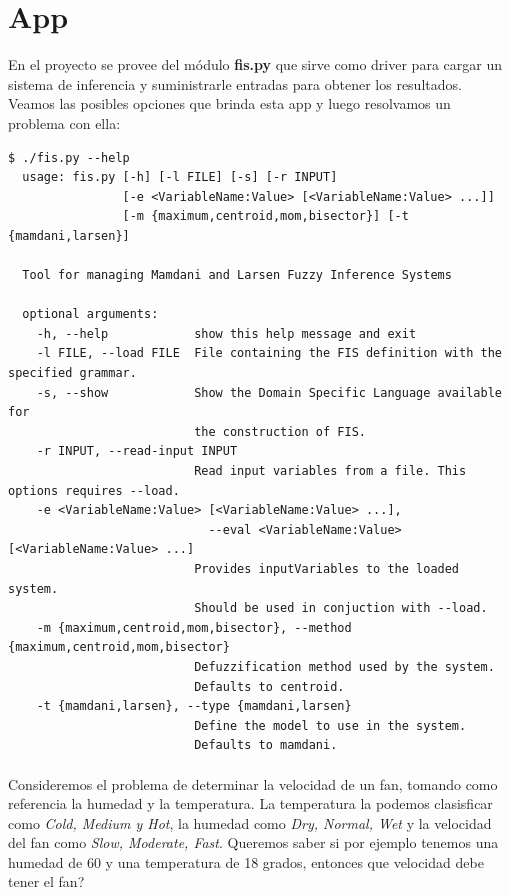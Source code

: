 \documentclass[a4paper, 12pt]{article}
\begin{document}
\section*{App}
En el proyecto se provee del m\'odulo \textbf{fis.py} que sirve como driver para cargar un sistema de 
inferencia y suministrarle entradas para obtener los resultados. Veamos las posibles opciones que brinda
esta app y luego resolvamos un problema con ella:

\begin{verbatim}
$ ./fis.py --help
  usage: fis.py [-h] [-l FILE] [-s] [-r INPUT] 
                [-e <VariableName:Value> [<VariableName:Value> ...]]
                [-m {maximum,centroid,mom,bisector}] [-t {mamdani,larsen}]

  Tool for managing Mamdani and Larsen Fuzzy Inference Systems

  optional arguments:
    -h, --help            show this help message and exit
    -l FILE, --load FILE  File containing the FIS definition with the specified grammar.
    -s, --show            Show the Domain Specific Language available for 
                          the construction of FIS.
    -r INPUT, --read-input INPUT
                          Read input variables from a file. This options requires --load.
    -e <VariableName:Value> [<VariableName:Value> ...], 
                            --eval <VariableName:Value> [<VariableName:Value> ...]
                          Provides inputVariables to the loaded system. 
                          Should be used in conjuction with --load.
    -m {maximum,centroid,mom,bisector}, --method {maximum,centroid,mom,bisector}
                          Defuzzification method used by the system. 
                          Defaults to centroid.
    -t {mamdani,larsen}, --type {mamdani,larsen}
                          Define the model to use in the system. 
                          Defaults to mamdani.
\end{verbatim}

\paragraph{}
Consideremos el problema de determinar la velocidad de un fan, tomando como referencia la humedad
y la temperatura. La temperatura la podemos clasisficar como \textit{Cold, Medium y Hot}, la humedad
como \textit{Dry, Normal, Wet} y la velocidad del fan como \textit{Slow, Moderate, Fast}. Queremos saber
si por ejemplo tenemos una humedad de 60 y una temperatura de 18 grados, entonces que velocidad debe
tener el fan?
\end{document}
